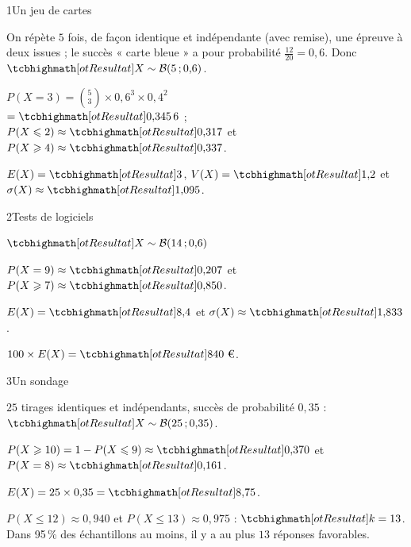 

\begin{deuxcolonnes}

\begin{corrige}{1}{Un jeu de cartes}
\begin{questions}
  \item On répète $5$ fois, de façon identique et indépendante (avec remise), une épreuve à deux issues ; le succès « carte bleue »
    a pour probabilité $\frac{12}{20}=0{,}6$. Donc $\res{X\sim\mathcal{B}(5\pv0{,}6)}$.
  \item $P(X=3)=\binom53\times0{,}6^{3}\times0{,}4^{2}$\\ $=\res{0{,}345\,6}$ ;\\
    $P(X\leq2)\approx\res{0{,}317}$ et\\ $P(X\geq4)\approx\res{0{,}337}$.
  \item $E(X)=\res{3}$, $V(X)=\res{1{,}2}$ et\\ $\sigma(X)\approx\res{1{,}095}$.
\end{questions}
\end{corrige}

\begin{corrige}{2}{Tests de logiciels}
\begin{questions}
  \item $\res{X\sim\mathcal{B}(14\pv0{,}6)}$
  \item $P(X=9)\approx\res{0{,}207}$ et\\ $P(X\geq7)\approx\res{0{,}850}$.
  \item $E(X)=\res{8{,}4}$ et $\sigma(X)\approx\res{1{,}833}$.
  \item $100\times E(X)=\res{840\text{ €}}$.
\end{questions}
\end{corrige}

\begin{corrige}{3}{Un sondage}
\begin{questions}
  \item $25$ tirages identiques et indépendants, succès de probabilité $0{,}35$ : $\res{X\sim\mathcal{B}(25\pv0{,}35)}$.
  \item $P(X\geq10)=1-P(X\leq9)\approx\res{0{,}370}$ et $P(X=8)\approx\res{0{,}161}$.
  \item $E(X)=25\times0{,}35=\res{8{,}75}$.
  \item $P(X\leq12)\approx0{,}940$ et $P(X\leq13)\approx0{,}975$ : $\res{k=13}$. Dans 95\,\% des échantillons au moins, il y a
    au plus $13$ réponses favorables.
\end{questions}
\end{corrige}


\end{deuxcolonnes}
